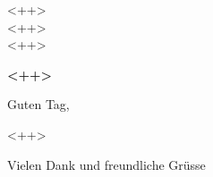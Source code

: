 \documentclass[a4paper,11pt]{letter}
\begin{document}
\begin{letter}{ <++>\\ <++>\\ <++>}


\opening{\textbf{<++>}}

Guten Tag,

<++>

\closing{Vielen Dank und freundliche Grüsse}
\vspace{20mm}

\end{letter}
\end{document}
